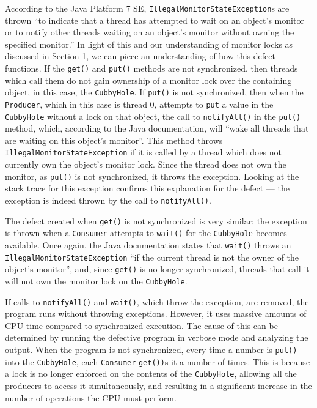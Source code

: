 \documentclass[12pt,a4paper]{article}
\begin{document}
  	According to the Java Platform 7 SE, \allowbreak\texttt{IllegalMonitorStateException}s are thrown ``to indicate that a thread has attempted to wait on an object's monitor or to notify other threads waiting on an object's monitor without owning the specified monitor.'' In light of this and our understanding of monitor locks as discussed in Section 1, we can piece an understanding of how this defect functions. If the \texttt{get()} and \texttt{put()} methods are not synchronized, then threads which call them do not gain ownership of a monitor lock over the containing object, in this case, the \texttt{CubbyHole}. If \texttt{put()} is not synchronized, then when the \texttt{Producer}, which in this case is thread 0, attempts to \texttt{put} a value in the \texttt{CubbyHole} without a lock on that object, the call to \texttt{notifyAll()} in the \texttt{put()} method, which, according to the Java documentation, will ``wake all threads that are waiting on this object's monitor''. This method throws \allowbreak\texttt{IllegalMonitorStateException} if it is called by a thread which does not currently own the object's monitor lock. Since the thread does not own the monitor, as \texttt{put()} is not synchronized, it throws the exception. Looking at the stack trace for this exception confirms this explanation for the defect --- the exception is indeed thrown by the call to \texttt{notifyAll()}.

  	The defect created when \texttt{get()} is not synchronized is very similar: the exception is thrown when a \texttt{Consumer} attempts to \texttt{wait()} for the \texttt{CubbyHole} becomes available. Once again, the Java documentation states that \texttt{wait()} throws an \allowbreak\texttt{IllegalMonitorStateException} ``if the current thread is not the owner of the object's monitor'', and, since \texttt{get()} is no longer synchronized, threads that call it will not own the monitor lock on the \texttt{CubbyHole}.

  	If calls to \texttt{notifyAll()} and \texttt{wait()}, which throw the exception, are removed, the program runs without throwing exceptions. However, it uses massive amounts of CPU time compared to synchronized execution. The cause of this can be determined by running the defective program in verbose mode and analyzing the output. When the program is not synchronized, every time a number is \texttt{put()} into the \texttt{CubbyHole}, each \texttt{Consumer} \texttt{get())}s it a number of times. This is because a lock is no longer enforced on the contents of the \texttt{CubbyHole}, allowing all the producers to access it simultaneously, and resulting in a significant increase in the number of operations the CPU must perform.
\end{document}
